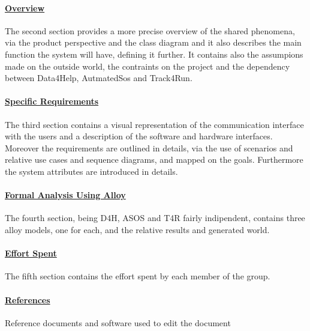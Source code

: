 \paragraph{\hyperref[sect:overview]{Overview}} The second section provides a more precise overview of the shared phenomena, via the product perspective and the class diagram and it also describes the main function the system will have, defining it further. It contains also the assumpions made on the outside world, the contraints on the project and the dependency between Data4Help, AutmatedSos and Track4Run.
\paragraph{\hyperref[sect:requirements]{Specific Requirements}} The third section contains a visual representation of the communication interface with the users and a description of the software and hardware interfaces. Moreover the requirements are outlined in details, via the use of scenarios and relative use cases and sequence diagrams, and mapped on the goals. Furthermore the system attributes are introduced in details.
\paragraph{\hyperref[sect:alloy]{Formal Analysis Using Alloy}} The fourth section, being D4H, ASOS and T4R fairly indipendent, contains three alloy models, one for each, and the relative results and generated world.
\paragraph{\hyperref[sect:effort]{Effort Spent}} The fifth section contains the effort spent by each member of the group.
\paragraph{\hyperref[sect:references]{References}} Reference documents and software used to edit the document


